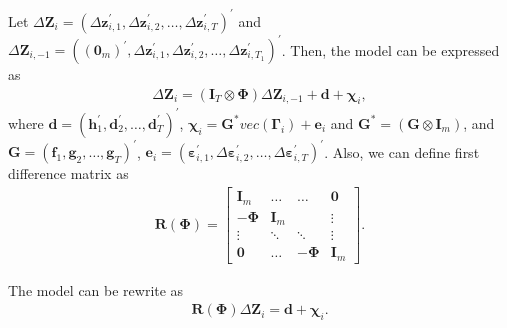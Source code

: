 \documentclass[12pt,a4paper,hyperref]{article}
\begin{document}
Let $\Delta \boldsymbol{Z}_{i}=\left(\Delta \boldsymbol{z}_{i,1}^{'}, \Delta \boldsymbol{z}_{i,2}^{'},\ldots, \Delta \boldsymbol{z}_{i,T}^{'} \right)^{'}$ and $\Delta \boldsymbol{Z}_{i,-1}=\left((\boldsymbol{0}_{m})^{'}, \Delta \boldsymbol{z}_{i,1}^{'}, \Delta \boldsymbol{z}_{i,2}^{'},\ldots, \Delta \boldsymbol{z}_{i,T_1}^{'} \right)^{'}$. Then, the model can be expressed as
\begin{align}
\Delta \boldsymbol{Z}_{i}=\left(\boldsymbol{I}_{T}\otimes  \boldsymbol{\Phi} \right)\Delta \boldsymbol{Z}_{i,-1}+\boldsymbol{d}+\boldsymbol{\chi}_{i},
\end{align}
where
$\boldsymbol{d}=\left(\boldsymbol{h}^{'}_{1}, \boldsymbol{d}^{'}_{2},\ldots, \boldsymbol{d}^{'}_{T} \right)^{'}$, $\boldsymbol{\chi}_{i}= \boldsymbol{G}^{\ast}  vec \left(\boldsymbol{\Gamma}_{i}\right)+\boldsymbol{e}_{i}$  and  $\boldsymbol{G}^{\ast}=\left(\boldsymbol{G} \otimes \boldsymbol{I}_{m} \right) $, and $\boldsymbol{G}=\left(\boldsymbol{f}_{1}, \boldsymbol{g}_{2},\ldots, \boldsymbol{g}_{T} \right)^{'}$, $\boldsymbol{e}_{i}=\left( \boldsymbol{\varepsilon}_{i,1}^{'}, \Delta \boldsymbol{\varepsilon}_{i,2}^{'},\ldots,\Delta \boldsymbol{\varepsilon}_{i,T}^{'} \right)^{'}$.
Also, we can  define first difference matrix as
\begin{align}
\boldsymbol{R}(\boldsymbol{\Phi})=
\begin{bmatrix}
\boldsymbol{I}_{m} & \ldots             &\ldots & \boldsymbol{0} \\
-\boldsymbol{\Phi} & \boldsymbol{I}_{m} &       &           \vdots     \\
  \vdots        &       \ddots       &  \ddots &       \vdots       \\
    \boldsymbol{0} &   \ldots &    -\boldsymbol{\Phi}    &  \boldsymbol{I}_{m}
\end{bmatrix}.
\end{align}

The model can be rewrite as
\begin{align}
\boldsymbol{R\left( \Phi\right)} \Delta \boldsymbol{Z}_{i}=\boldsymbol{d}+\boldsymbol{\chi}_{i}. \label{7}
\end{align}
\end{document}
